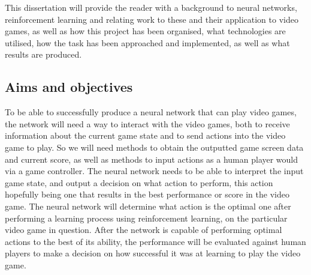 \documentclass[10pt]{article}
\begin{document}
	 This dissertation will provide the reader with a background to neural networks, reinforcement learning and relating work to these and their application to video games, as well as how this project has been organised, what technologies are utilised, how the task has been approached and implemented, as well as what results are produced.
	
	
	
	
	
\medskip

\subsection{Aims and objectives}
	To be able to successfully produce a neural network that can play video games, the network will need a way to interact with the video games, both to receive information about the current game state and to send actions into the video game to play. So we will need methods to obtain the outputted game screen data and current score, as well as methods to input actions as a human player would via a game controller. The neural network needs to be able to interpret the input game state, and output a decision on what action to perform, this action hopefully being one that results in the best performance or score in the video game. The neural network will determine what action is the optimal one after performing a learning process using reinforcement learning, on the particular video game in question. After the network is capable of performing optimal actions to the best of its ability, the performance will be evaluated against human players to make a decision on how successful it was at learning to play the video game.\\
	
\end{document}
